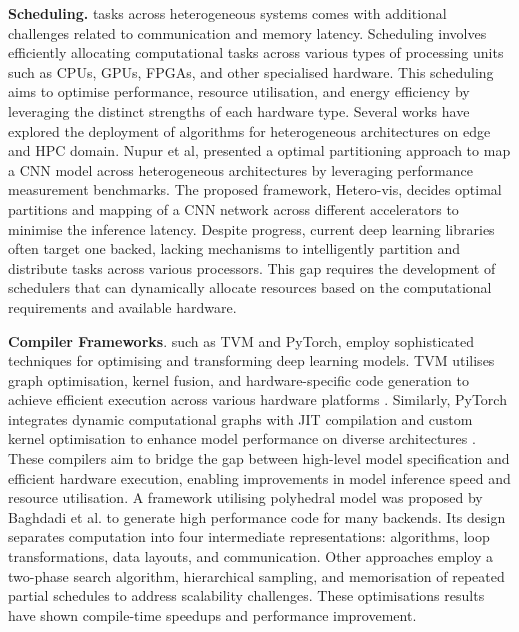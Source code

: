 \documentclass[]{spie}  %
\begin{document}
\noindent\textbf{Scheduling.} tasks across heterogeneous systems comes with additional challenges related to communication and memory latency. Scheduling involves efficiently allocating computational tasks across various types of processing units such as CPUs, GPUs, FPGAs, and other specialised hardware. This scheduling aims to optimise performance, resource utilisation, and energy efficiency by leveraging the distinct strengths of each hardware type. Several works have explored the deployment of algorithms for heterogeneous architectures on edge and HPC domain\cite{KheHardMue24,RatGouHog23}.  Nupur et al\cite{SumRaw22}, presented a optimal partitioning approach to map a CNN model across heterogeneous architectures by leveraging performance measurement benchmarks. The proposed framework, Hetero-vis, decides optimal partitions and mapping of a CNN network across different accelerators to minimise the inference latency. Despite progress, current deep learning libraries often target one backed, lacking mechanisms to intelligently partition and distribute tasks across various processors. This gap requires the development of schedulers that can dynamically allocate resources based on the computational requirements and available hardware\cite{KanLeeKil21, LanBhaSou2016}.

\noindent\textbf{Compiler Frameworks}. such as TVM and PyTorch, employ sophisticated techniques for optimising and transforming deep learning models. TVM utilises graph optimisation, kernel fusion, and hardware-specific code generation to achieve efficient execution across various hardware platforms \cite{chen2018}. Similarly, PyTorch integrates dynamic computational graphs with JIT compilation and custom kernel optimisation to enhance model performance on diverse architectures \cite{Pytorch}. These compilers aim to bridge the gap between high-level model specification and efficient hardware execution, enabling improvements in model inference speed and resource utilisation. A framework utilising polyhedral model was proposed by Baghdadi et al.\cite{BagRiyRay19} to generate high performance code for many backends. Its design separates computation into four intermediate representations: algorithms, loop transformations, data layouts, and communication. Other approaches employ a two-phase search algorithm, hierarchical sampling, and memorisation of repeated partial schedules to address scalability challenges. These optimisations results have shown compile-time speedups and performance improvement\cite{Halide2018}.

\end{document}
